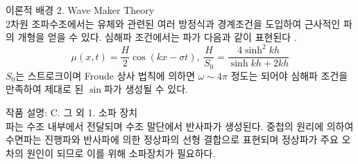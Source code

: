 \documentclass[a0paper,portrait]{baposter}
\begin{document}
\begin{poster}
\begin{posterbox}[name=theo,column=0,below=intro]{이론적 배경}
   \small {2. Wave Maker Theory\\}
     \scriptsize 2차원 조파수조에서는 유체와 관련된 여러 방정식과 경계조건을 도입하여 근사적인 파의 개형을 얻을 수 있다. 심해파 조건에서는 파가 다음과 같이 표현된다 \cite{ART002413750, ART002785404, dean1991water}.
      \begin{equation*}
         \mu(x,t)=\frac{H}{2}\cos(kx-\sigma t),~\frac{H}{S_0}=\frac{4\sinh^2 kh}{\sinh kh + 2kh}
      \end{equation*}
         $S_0$는 스트로크이며 Froude 상사 법칙에 의하면 $\omega \sim 4\pi$ 정도는 되어야 심해파 조건을 만족하여 제대로 된 $\sin$파가 생성될 수 있다.
\end{posterbox}

\begin{posterbox}[name=wmaker,column=0,below=theo, above=bottom] {작품 설명: C. 그 외}
\small {1. 소파 장치\\}
    \scriptsize {파는 수조 내부에서 전달되며 수조 말단에서 반사파가 생성된다. 중첩의 원리에 의하여 수면파는 진행파와 반사파에 의한 정상파의 선형 결합으로 표현되며 정상파가 주요 오차의 원인이 되므로 이를 위해 소파장치가 필요하다.}\\


\end{posterbox}
\end{poster}
\end{document}
